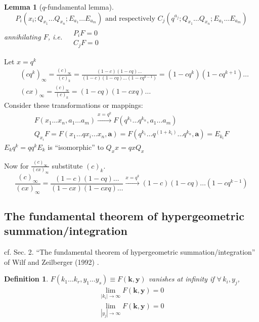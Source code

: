 \documentclass[10pt]{amsart}
\newtheorem{lemma}{Lemma}
\newtheorem{definition}{Definition}
\begin{document}
\begin{multicols*}{2}
\begin{lemma}[$q$-fundamental lemma]
\[
P_i(x_i; Q_{x_1} \dots Q_{x_n}; E_{a_1} \dots E_{a_m} ) \text{ and respectively } C_j(q^{a_j}; Q_{x_1} \dots Q_{x_n} ; E_{a_1} \dots E_{a_m} )
\]
annihilating $F$, i.e. $\begin{aligned} & \quad \\
  & P_iF = 0  \\
  & C_jF =0 \end{aligned}$
\end{lemma}

Let $x=q^k$
\[
\begin{aligned}
  & (cq^k)_{\infty} = \frac{(c)_{\infty}}{(c)_k} = \frac{(1-c)(1-cq) \dots }{ (1-c)(1-cq) \dots (1-cq^{k-1} )} = (1-cq^k)(1-cq^{k+1}) \dots \\ 
  & (cx)_{\infty} = \frac{(c)_{\infty}}{(c)_k} = (1-cq)(1-cxq) \dots 
\end{aligned}
\]
Consider these transformations or mappings:
\[
\begin{gathered}
  F(x_1 \dots x_n, a_1 \dots a_m) \xrightarrow{ x=q^k} F(q^{k_1} \dots q^{k_n}, a_1 \dots a_m) \\ 
  Q_{x_i} F = F(x_1 \dots qx_i \dots x_n, \mathbf{a}) = F(q^{k_1} \dots q^{(1+k_i)} \dots q^{k_n}, \mathbf{a}) = E_{k_i}F
\end{gathered}
\]
$E_kq^k = qq^k E_k$ is ``isomorphic'' to $Q_xx = qxQ_x$

Now for $\frac{(c)_{\infty}}{(cx)_{\infty}} $ substitute $(c)_k$.  
\[
\frac{(c)_{\infty}}{(cx)_{\infty}} = \frac{(1-c)(1-cq) \dots }{ (1-cx)(1-cxq) \dots } \xrightarrow{ x=q^k} (1-c)(1-cq) \dots (1-cq^{k-1})
\]

\subsection{The fundamental theorem of hypergeometric summation/integration}

cf. Sec. 2. ``The fundamental theorem of hypergeometric summation/integration'' of Wilf and Zeilberger (1992) \cite{HWilfDZeilberger1992}.  

\begin{definition}
  $F(k_1 \dots k_r, y_1 \dots y_s) \equiv F(\mathbf{k}, \mathbf{y})$ vanishes at infinity if $\forall \, k_i, y_j$,
\[
\begin{gathered}
  \lim_{|k_i|\to \infty} F(\mathbf{k},\mathbf{y}) =0 \\
  \lim_{|y_j|\to \infty} F(\mathbf{k},\mathbf{y}) = 0 
\end{gathered}
\]
\end{definition}


\end{multicols*}
\end{document}
